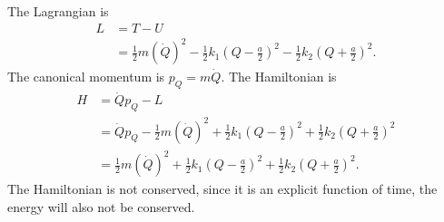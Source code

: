 \documentclass[10pt]{article}
\begin{document}
The Lagrangian is
\begin{align*}
  L &= T-U\\
   &= \frac{1}{2}m\left( \dot Q \right)^2 - \frac{1}{2}k_1\left( Q-\frac{a}{2} \right)^2 - \frac{1}{2}k_2\left( Q+\frac{a}{2} \right)^2.
\end{align*}
The canonical momentum is $p_Q = m\dot Q$.  The Hamiltonian is
\begin{align*}
  H &= \dot Q p_Q - L\\
   &= \dot Q p_Q - \frac{1}{2}m\left( \dot Q \right)^2 + \frac{1}{2}k_1\left( Q-\frac{a}{2} \right)^2 + \frac{1}{2}k_2\left( Q+\frac{a}{2} \right)^2\\
   &= \frac{1}{2}m\left( \dot Q \right)^2 + \frac{1}{2}k_1\left( Q-\frac{a}{2} \right)^2 + \frac{1}{2}k_2\left( Q+\frac{a}{2} \right)^2.
\end{align*}
The Hamiltonian is not conserved, since it is an explicit function of time, the energy will also not be conserved.
\end{document}

